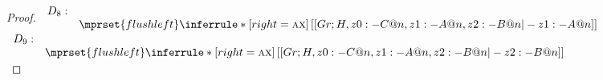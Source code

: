 \begin{proof}
  \begin{math}
    \begin{array}{lcl}
      D_8:\\
      &
      $$\mprset{flushleft}
      \inferrule* [right= \ifrName{ax}] {
        \,
      }{[[Gr;H, z0 :- C @ n, z1 : - A @ n, z2 : - B @ n |- z1 : - A @n ]]}
    \end{array}
  \end{math} \\

  \begin{math}
    \begin{array}{lcl}
      D_9:\\
      &
      $$\mprset{flushleft}
      \inferrule* [right= \ifrName{ax}] {
        \,
      }{[[Gr;H, z0 :- C @ n, z1 : - A @ n, z2 : - B @ n |- z2 : - B @n ]]}
    \end{array}
  \end{math} \\
\end{proof}


